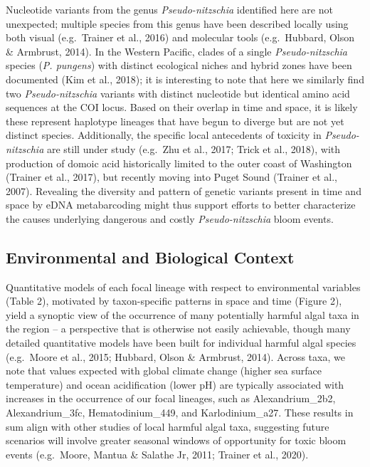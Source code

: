 \documentclass[
]{article}
\begin{document}
Nucleotide variants from the genus \emph{Pseudo-nitzschia} identified
here are not unexpected; multiple species from this genus have been
described locally using both visual (e.g.~Trainer et al., 2016) and
molecular tools (e.g.~Hubbard, Olson \& Armbrust, 2014). In the Western
Pacific, clades of a single \emph{Pseudo-nitzschia} species (\emph{P.
pungens}) with distinct ecological niches and hybrid zones have been
documented (Kim et al., 2018); it is interesting to note that here we
similarly find two \emph{Pseudo-nitzschia} variants with distinct
nucleotide but identical amino acid sequences at the COI locus. Based on
their overlap in time and space, it is likely these represent haplotype
lineages that have begun to diverge but are not yet distinct species.
Additionally, the specific local antecedents of toxicity in
\emph{Pseudo-nitzschia} are still under study (e.g.~Zhu et al., 2017;
Trick et al., 2018), with production of domoic acid historically limited
to the outer coast of Washington (Trainer et al., 2017), but recently
moving into Puget Sound (Trainer et al., 2007). Revealing the diversity
and pattern of genetic variants present in time and space by eDNA
metabarcoding might thus support efforts to better characterize the
causes underlying dangerous and costly \emph{Pseudo-nitzschia} bloom
events.

\hypertarget{environmental-and-biological-context-1}{%
\subsection{Environmental and Biological
Context}\label{environmental-and-biological-context-1}}

Quantitative models of each focal lineage with respect to environmental
variables (Table 2), motivated by taxon-specific patterns in space and
time (Figure 2), yield a synoptic view of the occurrence of many
potentially harmful algal taxa in the region -- a perspective that is
otherwise not easily achievable, though many detailed quantitative
models have been built for individual harmful algal species (e.g.~Moore
et al., 2015; Hubbard, Olson \& Armbrust, 2014). Across taxa, we note
that values expected with global climate change (higher sea surface
temperature) and ocean acidification (lower pH) are typically associated
with increases in the occurrence of our focal lineages, such as
Alexandrium\_2b2, Alexandrium\_3fc, Hematodinium\_449, and
Karlodinium\_a27. These results in sum align with other studies of local
harmful algal taxa, suggesting future scenarios will involve greater
seasonal windows of opportunity for toxic bloom events (e.g.~Moore,
Mantua \& Salathe Jr, 2011; Trainer et al., 2020).
\end{document}
